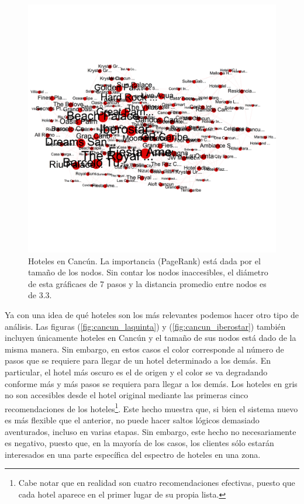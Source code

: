 \documentclass[12pt]{report}
\begin{document}
\begin{figure}[ht]
	\centering
	\includegraphics[height=0.70\textwidth, angle=90,
		trim = 0 900 0 900, clip]{imagenes/cancun.png}
	\caption{\label{fig:cancun} Hoteles en Cancún. La importancia (PageRank) está dada por el tamaño de los nodos. Sin contar los nodos inaccesibles, el diámetro de esta gráficaes de 7 pasos y la distancia promedio entre nodos es de 3.3.}
\end{figure}

Ya con una idea de qué hoteles son los más relevantes podemos hacer otro tipo de análisis. Las figuras (\ref{fig:cancun_laquinta}) y (\ref{fig:cancun_iberostar}) también incluyen únicamente hoteles en Cancún y el tamaño de sus nodos está dado de la misma manera. Sin embargo, en estos casos el color corresponde al número de pasos que se requiere para llegar de un hotel determinado a los demás. En particular, el hotel más oscuro es el de origen y el color se va degradando conforme más y más pasos se requiera para llegar a los demás. Los hoteles en gris no son accesibles desde el hotel original mediante las primeras cinco recomendaciones de los hoteles\footnote{Cabe notar que en realidad son cuatro recomendaciones efectivas, puesto que cada hotel aparece en el primer lugar de su propia lista.}. Este hecho muestra que, si bien el sistema nuevo es más flexible que el anterior, no puede hacer saltos lógicos demasiado aventurados, incluso en varias etapas. Sin embargo, este hecho no necesariamente es negativo, puesto que, en la mayoría de los casos, los clientes sólo estarán interesados en una parte específica del espectro de hoteles en una zona.
\end{document}

